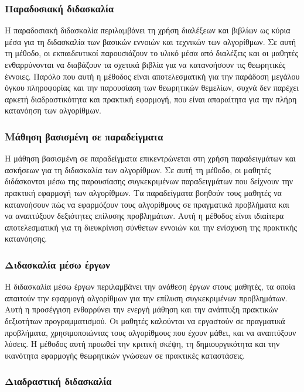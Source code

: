 \subsubsection{Παραδοσιακή διδασκαλία}

Η παραδοσιακή διδασκαλία περιλαμβάνει τη χρήση διαλέξεων και βιβλίων ως κύρια μέσα για τη διδασκαλία των βασικών εννοιών και τεχνικών των αλγορίθμων. Σε αυτή τη μέθοδο, οι εκπαιδευτικοί παρουσιάζουν το υλικό μέσα από διαλέξεις και οι μαθητές ενθαρρύνονται να διαβάζουν τα σχετικά βιβλία για να κατανοήσουν τις θεωρητικές έννοιες. Παρόλο που αυτή η μέθοδος είναι αποτελεσματική για την παράδοση μεγάλου όγκου πληροφορίας και την παρουσίαση των θεωρητικών θεμελίων, συχνά δεν παρέχει αρκετή διαδραστικότητα και πρακτική εφαρμογή, που είναι απαραίτητα για την πλήρη κατανόηση των αλγορίθμων\cite{__2017}.

\subsubsection{Μάθηση βασισμένη σε παραδείγματα}

Η μάθηση βασισμένη σε παραδείγματα επικεντρώνεται στη χρήση παραδειγμάτων και ασκήσεων για τη διδασκαλία των αλγορίθμων. Σε αυτή τη μέθοδο, οι μαθητές διδάσκονται μέσω της παρουσίασης συγκεκριμένων παραδειγμάτων που δείχνουν την πρακτική εφαρμογή των αλγορίθμων. Τα παραδείγματα βοηθούν τους μαθητές να κατανοήσουν πώς να εφαρμόζουν τους αλγορίθμους σε πραγματικά προβλήματα και να αναπτύξουν δεξιότητες επίλυσης προβλημάτων. Αυτή η μέθοδος είναι ιδιαίτερα αποτελεσματική για τη διευκρίνιση σύνθετων εννοιών και την ενίσχυση της πρακτικής κατανόησης\cite{crepinsek_note_2012}.

\subsubsection{Διδασκαλία μέσω έργων}

Η διδασκαλία μέσω έργων περιλαμβάνει την ανάθεση έργων στους μαθητές, τα οποία απαιτούν την εφαρμογή αλγορίθμων για την επίλυση συγκεκριμένων προβλημάτων. Αυτή η προσέγγιση ενθαρρύνει την ενεργή μάθηση και την ανάπτυξη πρακτικών δεξιοτήτων προγραμματισμού. Οι μαθητές καλούνται να εργαστούν σε πραγματικά προβλήματα, χρησιμοποιώντας τους αλγορίθμους που έχουν μάθει, και να αναπτύξουν λύσεις. Η μέθοδος αυτή προωθεί την κριτική σκέψη, τη δημιουργικότητα και την ικανότητα εφαρμογής θεωρητικών γνώσεων σε πρακτικές καταστάσεις\cite{bodner_role_1987}.

\subsubsection{Διαδραστική διδασκαλία}

